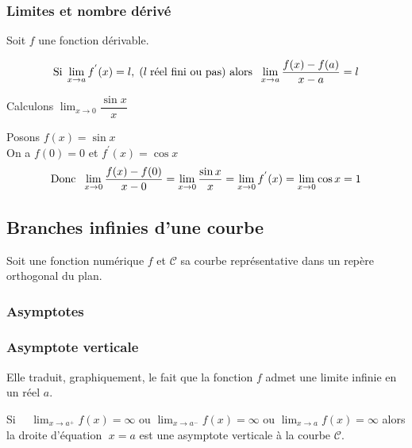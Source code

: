 \subsubsection*{Limites et nombre dérivé}

\begin{theorem}
Soit $ f $ une fonction dérivable.

\[ \text{Si}\; \displaystyle \lim_{x \to a}f^{'}(x)=l,\;  ( l \;\text{réel fini ou pas) alors \;} \displaystyle\lim_{x \to a} \dfrac{f(x)-f(a)}{x-a}=l\]
\end{theorem}

\begin{example}
Calculons $\displaystyle\lim_{x \to 0}\dfrac{\sin x}{x} $

Posons $ f(x)=\sin x $\\
On a $ f(0)=0 $ et  $ f^{'}(x)=\cos x$
 \[\text{Donc \;} \displaystyle \lim_{x \to 0} \frac{f(x)-f(0)}{x-0}=\displaystyle \lim_{x \to 0}\frac{\sin x}{x}=\displaystyle\lim_{x \to 0}f^{'}(x)=\displaystyle\lim_{x \to 0}\cos x =1\]
\end{example}

\subsection{Branches infinies d'une courbe}
Soit une fonction numérique $ f $ et $ \mathcal{C} $ sa courbe représentative dans un repère orthogonal du plan.
\subsubsection{Asymptotes}
\subsubsection*{Asymptote verticale}
Elle traduit, graphiquement, le fait que la fonction $f$ admet une limite infinie en un réel $a$.


\begin{definition}
Si $\quad \displaystyle\lim_{x \to a^{+}}f(x)=\infty$  ou 
$\displaystyle\lim_{x \to a^{-}}f(x)=\infty $  ou 
$\displaystyle\lim_{x \to a}f(x)=\infty $ alors  la droite  d'équation $\; x=a$ est une asymptote verticale à la courbe $\mathcal{C} $.
\end{definition}



